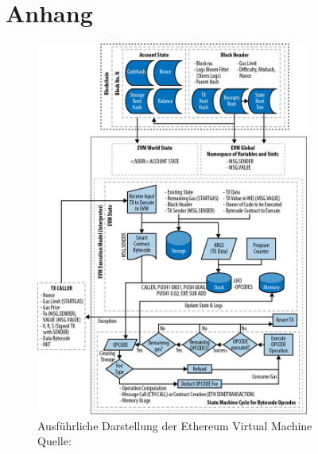 
\appendix
\chapter{Anhang}
\begin{figure}[htpb]
	\centering
	\includegraphics[width=0.8\textwidth]{images/evm_full.png}
	\caption{Ausführliche Darstellung der Ethereum Virtual Machine\\
	Quelle: \cite{antanopoulos_2014}}
	\label{6braun:fig:EVM_full}
\end{figure}